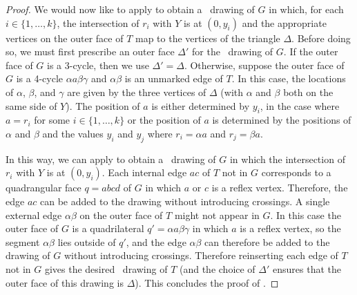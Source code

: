 \begin{proof}

        We would now like to apply  to 
	obtain a \Fary\ drawing of $G$ in which, for each $i\in\{1,\ldots,k\}$, the intersection of $r_i$
	with $Y$ is at $(0,y_i)$ and the appropriate vertices on the outer face of $T$ map to the vertices of the triangle $\Delta$.  Before doing so, we must first prescribe an outer face $\Delta'$ for the \Fary\ drawing of $G$.  If the outer face of $G$ is a 3-cycle, then we use $\Delta'=\Delta$.  Otherwise, suppose the outer face of $G$ is a 4-cycle $\alpha a\beta\gamma$ and $\alpha\beta$ is an unmarked edge of $T$.  In this case, the locations of $\alpha$, $\beta$, and $\gamma$ are given by the three vertices of $\Delta$ (with $\alpha$ and $\beta$ both on the same side of $Y$).  The position of $a$ is either determined by $y_i$, in the case where $a=r_i$ for some $i\in\{1,\ldots,k\}$ or the position of $a$ is determined by the positions of $\alpha$ and $\beta$ and the values $y_{i}$
and $y_j$ where $r_i=\alpha a$ and $r_j=\beta a$.

	In this way, we can apply  to
	obtain a \Fary\ drawing of $G$ in which the intersection of $r_i$
	with $Y$ is at $(0,y_i)$.  Each internal edge $ac$ of $T$ not in $G$
	corresponds to a quadrangular face $q=abcd$ of $G$ in which $a$ or $c$ is a
	reflex vertex.  Therefore, the edge $ac$ can be added to the drawing
	without introducing crossings.  A single external edge $\alpha\beta$
	on the outer face of $T$ might not appear in $G$. In this case the outer
	face of $G$ is a quadrilateral $q'=\alpha a \beta \gamma$ in which $a$ is
	a reflex vertex, so the segment $\alpha\beta$ lies outside of $q'$, and the edge $\alpha\beta$ can therefore be added to the drawing of $G$
	without introducing crossings. Therefore reinserting each edge of $T$ not in $G$ gives the desired \Fary\ drawing of $T$ (and the choice of $\Delta'$ ensures that the outer face of this drawing is $\Delta$). 
        This concludes the proof of .
\end{proof}
	
